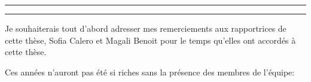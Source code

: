 
\begin{otherlanguage}{french}

\hrule\relax
\vspace*{.9\baselineskip}%
\raggedright{\huge{}}\par%
\vspace*{1.1\baselineskip}%
\hrule\relax
\vspace*{\baselineskip}%
\thispagestyle{empty}

\begingroup
\itshape

Je souhaiterais tout d'abord adresser mes remerciements aux rapportrices de cette thèse, Sofia Calero et Magali Benoit pour le temps qu'elles ont accordés à cette thèse. 




Ces années n'auront pas été si riches sans la présence des membres de l'équipe:





\endgroup

\clearpage
\mbox{}
\thispagestyle{empty}
\clearpage

%
%
%
%
%
%
%

\end{otherlanguage}
